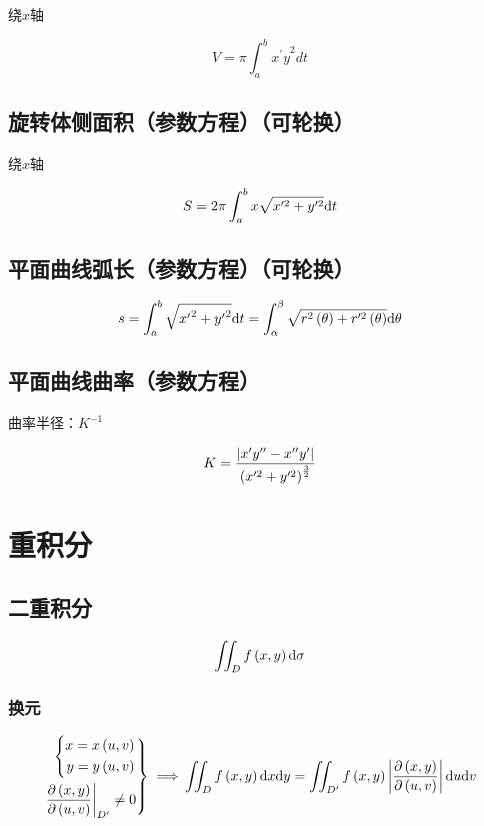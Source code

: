 \documentclass{article}
\begin{document}
绕$x$轴

\[V=\pi\int_a^b{{x^\prime y}^2dt}\]

\subsection{旋转体侧面积（参数方程）（可轮换）}

绕$x$轴

\[S=2\pi\int_a^b{x\sqrt{x^{\prime2}+y^{\prime2}}\mathrm d t}\]

\subsection{平面曲线弧长（参数方程）（可轮换）}

\[s=\int_a^b{\sqrt{{x^\prime}^2+{y^\prime}^2}\mathrm d t}=\int_{\alpha}^{\beta}{\sqrt{r^2\left(\theta\right)+r^{\prime2}\left(\theta\right)}\mathrm d\theta}\]

\subsection{平面曲线曲率（参数方程）}

曲率半径：$K^{-1}$

\[K=\frac{\left|x^\prime y^{\prime\prime}-x^{\prime\prime}y^\prime\right|}{\left(x^{\prime2}+y^{\prime2}\right)^\frac32}\]

\section{重积分}

\subsection{二重积分}

\begin{definition}[$\d\sigma=\d x\d y$]
    \[\iint_Df\left(x,y\right)\mathrm d\sigma\]
\end{definition}

\subsubsection{换元}

\[\left.\begin{aligned}
        \left\{\begin{aligned}
                   x=x\left(u,v\right) \\
                   y=y\left(u,v\right)
               \end{aligned}\right. \\
        \left.\frac{\partial\left(x,y\right)}{\partial\left(u,v\right)}\right|_{D^\prime}\neq0
    \end{aligned}\right\}\implies\\
    \iint_Df\left(x,y\right)\mathrm d x\mathrm d y=
    \iint_{D^\prime}f\left(x,y\right)\left|\frac{\partial\left(x,y\right)}{\partial\left(u,v\right)}\right|\mathrm d u\mathrm d v\]
\end{document}
